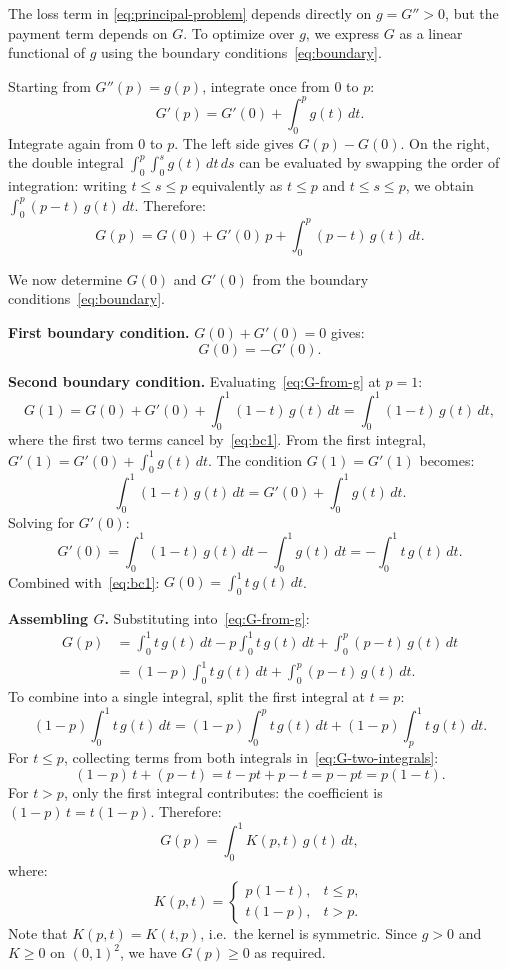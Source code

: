 \documentclass[11pt]{article}
\begin{document}
The loss term in \eqref{eq:principal-problem} depends directly on $g = G'' > 0$, but the payment term depends on $G$. To optimize over $g$, we express $G$ as a linear functional of $g$ using the boundary conditions~\eqref{eq:boundary}.

Starting from $G''(p) = g(p)$, integrate once from $0$ to $p$:
\[
G'(p) = G'(0) + \int_0^p g(t)\,dt.
\]
Integrate again from $0$ to $p$. The left side gives $G(p) - G(0)$. On the right, the double integral $\int_0^p \int_0^s g(t)\,dt\,ds$ can be evaluated by swapping the order of integration: writing $t \leq s \leq p$ equivalently as $t \leq p$ and $t \leq s \leq p$, we obtain $\int_0^p (p - t)\,g(t)\,dt$. Therefore:
\begin{equation}\label{eq:G-from-g}
G(p) = G(0) + G'(0)\,p + \int_0^p (p - t)\,g(t)\,dt.
\end{equation}

We now determine $G(0)$ and $G'(0)$ from the boundary conditions~\eqref{eq:boundary}.

\textbf{First boundary condition.} $G(0) + G'(0) = 0$ gives:
\begin{equation}\label{eq:bc1}
G(0) = -G'(0).
\end{equation}

\textbf{Second boundary condition.} Evaluating~\eqref{eq:G-from-g} at $p = 1$:
\[
G(1) = G(0) + G'(0) + \int_0^1 (1-t)\,g(t)\,dt = \int_0^1 (1-t)\,g(t)\,dt,
\]
where the first two terms cancel by~\eqref{eq:bc1}. From the first integral, $G'(1) = G'(0) + \int_0^1 g(t)\,dt$. The condition $G(1) = G'(1)$ becomes:
\[
\int_0^1 (1-t)\,g(t)\,dt = G'(0) + \int_0^1 g(t)\,dt.
\]
Solving for $G'(0)$:
\[
G'(0) = \int_0^1 (1-t)\,g(t)\,dt - \int_0^1 g(t)\,dt = -\int_0^1 t\,g(t)\,dt.
\]
Combined with~\eqref{eq:bc1}: $G(0) = \int_0^1 t\,g(t)\,dt$.

\textbf{Assembling $G$.} Substituting into~\eqref{eq:G-from-g}:
\begin{align}
G(p) &= \int_0^1 t\,g(t)\,dt - p\int_0^1 t\,g(t)\,dt + \int_0^p (p-t)\,g(t)\,dt \nonumber \\
      &= (1-p)\int_0^1 t\,g(t)\,dt + \int_0^p (p-t)\,g(t)\,dt. \label{eq:G-two-integrals}
\end{align}
To combine into a single integral, split the first integral at $t = p$:
\[
(1-p)\int_0^1 t\,g(t)\,dt = (1-p)\int_0^p t\,g(t)\,dt + (1-p)\int_p^1 t\,g(t)\,dt.
\]
For $t \leq p$, collecting terms from both integrals in~\eqref{eq:G-two-integrals}:
\[
(1-p)\,t + (p - t) = t - pt + p - t = p - pt = p(1-t).
\]
For $t > p$, only the first integral contributes: the coefficient is $(1-p)\,t = t(1-p)$.
Therefore:
\begin{equation}\label{eq:greens}
G(p) = \int_0^1 K(p,t)\,g(t)\,dt,
\end{equation}
where:
\begin{equation}\label{eq:kernel}
K(p,t) =
\begin{cases}
p(1-t), & t \leq p, \\
t(1-p), & t > p.
\end{cases}
\end{equation}
Note that $K(p,t) = K(t,p)$, i.e.\ the kernel is symmetric. Since $g > 0$ and $K \geq 0$ on $(0,1)^2$, we have $G(p) \geq 0$ as required.
\end{document}
